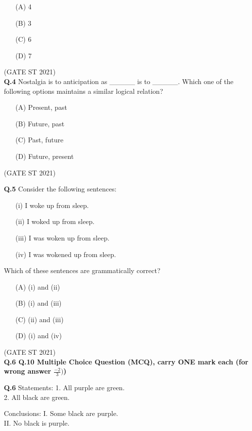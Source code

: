 \documentclass[journal,12pt,onecolumn]{IEEEtran}
\theoremstyle{remark}
\begin{document}
\begin{enumerate}
\item[(A)] 4
\item[(B)] 3
\item[(C)] 6
\item[(D)] 7
\end{enumerate}

\hfill (GATE ST 2021) \\

\textbf{Q.4}
Nostalgia is to anticipation as \_\_\_\_\_ is to \_\_\_\_\_.  
Which one of the following options maintains a similar logical relation?

\begin{enumerate}
\item[(A)] Present, past
\item[(B)] Future, past
\item[(C)] Past, future
\item[(D)] Future, present
\end{enumerate}
\hfill (GATE ST 2021)



\textbf{Q.5}
Consider the following sentences:
\begin{enumerate}
\item[(i)] I woke up from sleep.
\item[(ii)] I woked up from sleep.
\item[(iii)] I was woken up from sleep.
\item[(iv)] I was wokened up from sleep.
\end{enumerate}
Which of these sentences are grammatically correct?
\begin{enumerate}
\item[(A)] (i) and (ii)
\item[(B)] (i) and (iii)
\item[(C)] (ii) and (iii)
\item[(D)] (i) and (iv)
\end{enumerate}
\hfill (GATE ST 2021)\\


\textbf{Q.6 \text{-} Q.10 Multiple Choice Question (MCQ), carry ONE mark each (for wrong answer $\frac{-2}{3})$)}

\textbf{Q.6}
Statements:  
1. All purple are green. \\ 
2. All black are green.  

Conclusions: 
I. Some black are purple.  \\
II. No black is purple.
\end{document}
